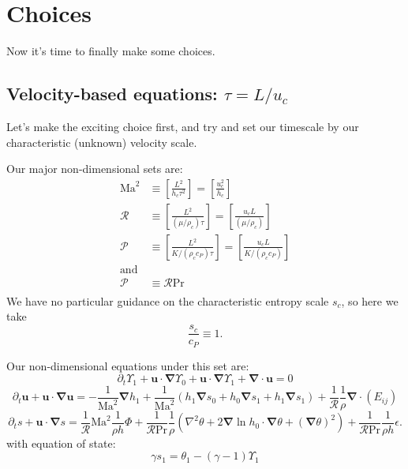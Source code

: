 \documentclass{aastex631}
\newcommand{\del}{\nabla}
\renewcommand{\vec}{\boldsymbol}
\newcommand{\grad}{\vec{\del}}
\newcommand{\scrR}{\mathcal{R}}
\newcommand{\scrP}{\mathcal{P}}
\newcommand{\Ma}{\mathrm{Ma}}
\renewcommand{\Pr}{\mathrm{Pr}}
\begin{document}
\section{Choices}
Now it's time to finally make some choices.

\subsection{Velocity-based equations: $\tau = L/u_c$}
Let's make the exciting choice first, and try and set our timescale by our characteristic (unknown) velocity scale.

Our major non-dimensional sets are:
\begin{align}
\Ma^{2} & \equiv \left[\frac{L^2}{h_c \tau^2}\right] = \left[\frac{u_c^2}{h_c}\right] \\
\scrR & \equiv \left[\frac{L^2}{(\mu/\rho_c) \tau}\right] = \left[\frac{u_c L}{(\mu/\rho_c)}\right] \\
\scrP & \equiv \left[\frac{L^2}{K/(\rho_c c_P)\tau}\right] = \left[\frac{u_c L}{K/(\rho_c c_P)}\right] \\
\text{and} \nonumber \\
\scrP &\equiv \scrR \Pr \\
\end{align}
We have no particular guidance on the characteristic entropy scale $s_c$, so here we take
\begin{equation}
  \frac{s_c}{c_P} \equiv 1.
\end{equation}

Our non-dimensional equations under this set are:
\begin{equation}
  \partial_t \Upsilon_1 + \vec{u}\cdot\grad \Upsilon_0 + \vec{u}\cdot\grad \Upsilon_1 + \grad \cdot \vec{u} = 0
\end{equation}
\begin{equation}
  \partial_t \vec{u} + \vec{u}\cdot\grad\vec{u} =
  -\frac{1}{\Ma^2}\grad h_1
  + \frac{1}{\Ma^2} \left(h_1\grad s_0 + h_0\grad s_1 + h_1 \grad s_1\right) + \frac{1}{\scrR}\frac{1}{\rho} \grad \cdot (E_{ij})
\end{equation}
\begin{equation}
  \partial_t s + \vec{u}\cdot\grad s =
  \frac{1}{\scrR} \Ma^2  \frac{1}{\rho h} \Phi
  + \frac{1}{\scrR \Pr} \frac{1}{\rho}\left(\nabla^2 \theta + 2 \grad \ln h_0 \cdot \grad \theta + (\grad \theta)^2\right)
  + \frac{1}{\scrR \Pr} \frac{1}{\rho h} \epsilon.
\end{equation}
with equation of state:
\begin{equation}
  \gamma s_1 = \theta_1 - (\gamma - 1)\Upsilon_1
\end{equation}
\end{document}
